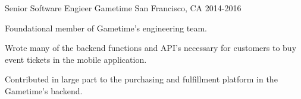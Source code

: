 \begin{cventries}
  \cventry
    {Senior Software Engieer} %
    {Gametime} %
    {San Francisco, CA} %
    {2014-2016} %
    {
      \begin{cvitems} %
        \item {Foundational member of Gametime's engineering team.}
        \item {Wrote many of the backend functions and API's necessary for customers to buy event tickets in the mobile application.}
        \item {Contributed in large part to the purchasing and fulfillment platform in the Gametime's backend.}
      \end{cvitems}
    }

\end{cventries}
